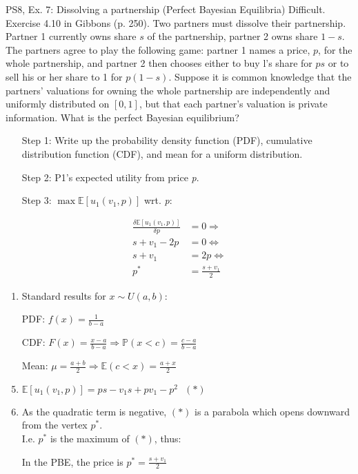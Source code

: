 \begin{frame}{PS8, Ex. 7: Dissolving a partnership (Perfect Bayesian Equilibria)}
    Difficult. Exercise 4.10 in Gibbons (p. 250). Two partners must dissolve their partnership. Partner 1 currently owns share $s$ of the partnership, partner 2 owns share $1-s$. The partners agree to play the following game: partner 1 names a price, $p$, for the whole partnership, and partner 2 then chooses either to buy l's share for $ps$ or to sell his or her share to 1 for $p(1-s)$. Suppose it is common knowledge that the partners' valuations for owning the whole partnership are independently and uniformly distributed on $[0,1]$, but that each partner's valuation is private information. What is the perfect Bayesian equilibrium?\vspace{-11pt}
    \begin{multicols}{2}
      \begin{itemize}
        \item[Step 1:] Write up the probability density function (PDF), cumulative distribution function (CDF), and mean for a uniform distribution.
        \item[Step 2:] P1's expected utility from price \textit{p}.
        \item[Step 3:] $\max\mathbb{E}[u_1(v_1,p)]$ wrt. \textit{p}:
      \end{itemize}\vspace{-6pt}
      \begin{align*}
        \frac{\delta \mathbb{E}[u_1(v_1,p)]}{\delta p}&=0\Rightarrow\\
        s+v_1-2p&=0\Leftrightarrow\\
        s+v_1&=2p\Leftrightarrow\\
        p^*&=\frac{s+v_1}{2}
      \end{align*}
      \vfill\null\columnbreak
      \begin{enumerate}
        \item Standard results for $x\sim U(a, b):$
        \item[PDF:]  $f(x)=\frac{1}{b-a}$
        \item[CDF:]  $F(x)=\frac{x-a}{b-a}\Rightarrow\mathbb{P}(x<c)=\frac{c-a}{b-a}$
        \item[Mean:] $\mu=\frac{a+b}{2}\Rightarrow\mathbb{E}(c<x)=\frac{a+x}{2}$
        \item $\mathbb{E}[u_1(v_1,p)]=ps-v_1s+pv_1-p^2\ \ \ (*)$
        \item As the quadratic term is negative, $(*)$ is a parabola which opens downward from the vertex $p^*$.\\
        I.e. $p^*$ is the maximum of $(*)$, thus:
        \item[] In the PBE, the price is $p^*=\frac{s+v_1}{2}$
      \end{enumerate}
      \vfill\null
    \end{multicols}
\end{frame}


